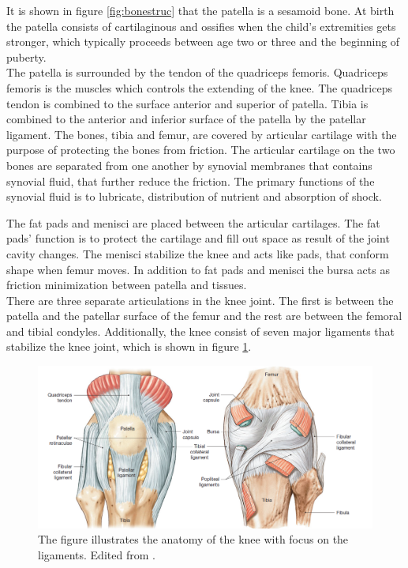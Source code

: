 \noindent
It is shown in figure \ref{fig:bonestruc} that the patella is a sesamoid bone. At birth the patella consists of cartilaginous and ossifies when the child’s extremities gets stronger, which typically proceeds between age two or three and the beginning of puberty. \\
\noindent
The patella is surrounded by the tendon of the quadriceps femoris. Quadriceps femoris is the muscles which controls the extending of the knee. The quadriceps tendon is combined to the surface anterior and superior of patella. Tibia is combined to the anterior and inferior surface of the patella by the patellar ligament. The bones, tibia and femur, are covered by articular cartilage with the purpose of protecting the bones from friction. The articular cartilage on the two bones are separated from one another by synovial membranes that contains synovial fluid, that further reduce the friction. The primary functions of the synovial fluid is to lubricate, distribution of nutrient and absorption of shock.\citep{Martini2012}

The fat pads and menisci are placed between the articular cartilages. The fat pads’ function is to protect the cartilage and fill out space as result of the joint cavity changes. The menisci stabilize the knee and acts like pads, that conform shape when femur moves. In addition to fat pads and menisci the bursa acts as friction minimization between patella and tissues.\citep{Martini2012} \\
There are three separate articulations in the knee joint. The first is between the patella and the patellar surface of the femur and the rest are between the femoral and tibial condyles. Additionally, the knee consist of seven major ligaments that stabilize the knee joint, which is shown in figure \ref{fig:knee}.\citep{Martini2012}

\begin{figure} [H]
\centering
\includegraphics[width=1\textwidth]{figures/knee}
\caption{The figure illustrates the anatomy of the knee with focus on the ligaments. Edited from \citep{Martini2012}.}
\label{fig:knee}
\end{figure}

